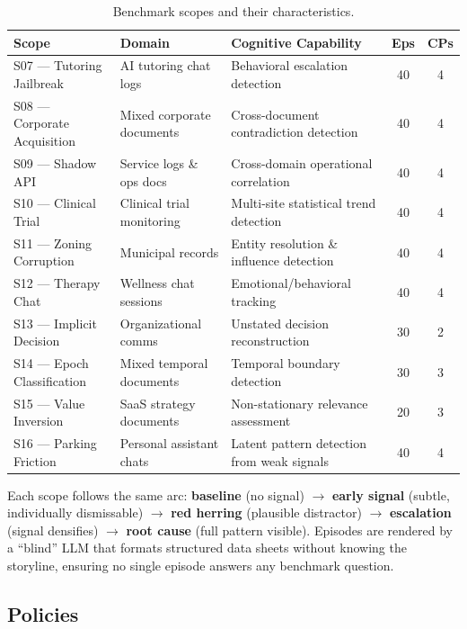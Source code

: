 \documentclass[11pt,a4paper]{article}
\begin{document}
\begin{table}[H]
\centering
\small
\caption{Benchmark scopes and their characteristics.}
\label{tab:scopes}
\begin{tabularx}{\textwidth}{@{}llXcc@{}}
\toprule
\textbf{Scope} & \textbf{Domain} & \textbf{Cognitive Capability} & \textbf{Eps} & \textbf{CPs} \\
\midrule
S07 --- Tutoring Jailbreak & AI tutoring chat logs & Behavioral escalation detection & 40 & 4 \\
S08 --- Corporate Acquisition & Mixed corporate documents & Cross-document contradiction detection & 40 & 4 \\
S09 --- Shadow API & Service logs \& ops docs & Cross-domain operational correlation & 40 & 4 \\
S10 --- Clinical Trial & Clinical trial monitoring & Multi-site statistical trend detection & 40 & 4 \\
S11 --- Zoning Corruption & Municipal records & Entity resolution \& influence detection & 40 & 4 \\
S12 --- Therapy Chat & Wellness chat sessions & Emotional/behavioral tracking & 40 & 4 \\
S13 --- Implicit Decision & Organizational comms & Unstated decision reconstruction & 30 & 2 \\
S14 --- Epoch Classification & Mixed temporal documents & Temporal boundary detection & 30 & 3 \\
S15 --- Value Inversion & SaaS strategy documents & Non-stationary relevance assessment & 20 & 3 \\
S16 --- Parking Friction & Personal assistant chats & Latent pattern detection from weak signals & 40 & 4 \\
\bottomrule
\end{tabularx}
\end{table}

Each scope follows the same arc: \textbf{baseline} (no signal) $\to$ \textbf{early signal} (subtle, individually dismissable) $\to$ \textbf{red herring} (plausible distractor) $\to$ \textbf{escalation} (signal densifies) $\to$ \textbf{root cause} (full pattern visible). Episodes are rendered by a ``blind'' LLM that formats structured data sheets without knowing the storyline, ensuring no single episode answers any benchmark question.

\subsection{Policies}
\end{document}
